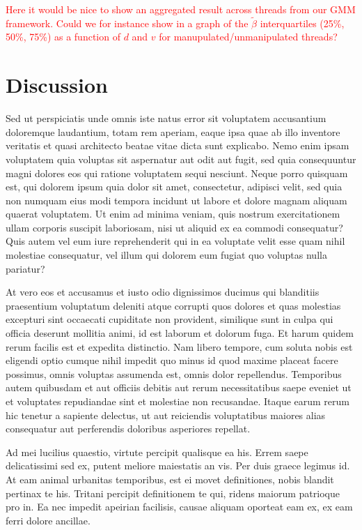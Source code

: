 \documentclass[9pt,twocolumn,twoside,lineno]{pnas-new}
\begin{document}
\textcolor{red}{
Here it would be nice to show an aggregated result across threads from our GMM framework. Could we for instance show in a graph of the $\tilde{\beta}$ interquartiles (25\%, 50\%, 75\%) as a function of $d$ and $v$ for manupulated/unmanipulated threads?
}

\section*{Discussion}
Sed ut perspiciatis unde omnis iste natus error sit voluptatem accusantium doloremque laudantium, totam rem aperiam, eaque ipsa quae ab illo inventore veritatis et quasi architecto beatae vitae dicta sunt explicabo. Nemo enim ipsam voluptatem quia voluptas sit aspernatur aut odit aut fugit, sed quia consequuntur magni dolores eos qui ratione voluptatem sequi nesciunt. Neque porro quisquam est, qui dolorem ipsum quia dolor sit amet, consectetur, adipisci velit, sed quia non numquam eius modi tempora incidunt ut labore et dolore magnam aliquam quaerat voluptatem. Ut enim ad minima veniam, quis nostrum exercitationem ullam corporis suscipit laboriosam, nisi ut aliquid ex ea commodi consequatur? Quis autem vel eum iure reprehenderit qui in ea voluptate velit esse quam nihil molestiae consequatur, vel illum qui dolorem eum fugiat quo voluptas nulla pariatur?

At vero eos et accusamus et iusto odio dignissimos ducimus qui blanditiis praesentium voluptatum deleniti atque corrupti quos dolores et quas molestias excepturi sint occaecati cupiditate non provident, similique sunt in culpa qui officia deserunt mollitia animi, id est laborum et dolorum fuga. Et harum quidem rerum facilis est et expedita distinctio. Nam libero tempore, cum soluta nobis est eligendi optio cumque nihil impedit quo minus id quod maxime placeat facere possimus, omnis voluptas assumenda est, omnis dolor repellendus. Temporibus autem quibusdam et aut officiis debitis aut rerum necessitatibus saepe eveniet ut et voluptates repudiandae sint et molestiae non recusandae. Itaque earum rerum hic tenetur a sapiente delectus, ut aut reiciendis voluptatibus maiores alias consequatur aut perferendis doloribus asperiores repellat.

Ad mei lucilius quaestio, virtute percipit qualisque ea his. Errem saepe delicatissimi sed ex, putent meliore maiestatis an vis. Per duis graece legimus id. At eam animal urbanitas temporibus, est ei movet definitiones, nobis blandit pertinax te his. Tritani percipit definitionem te qui, ridens maiorum patrioque pro in. Ea nec impedit apeirian facilisis, causae aliquam oporteat eam ex, ex eam ferri dolore ancillae.
\end{document}
